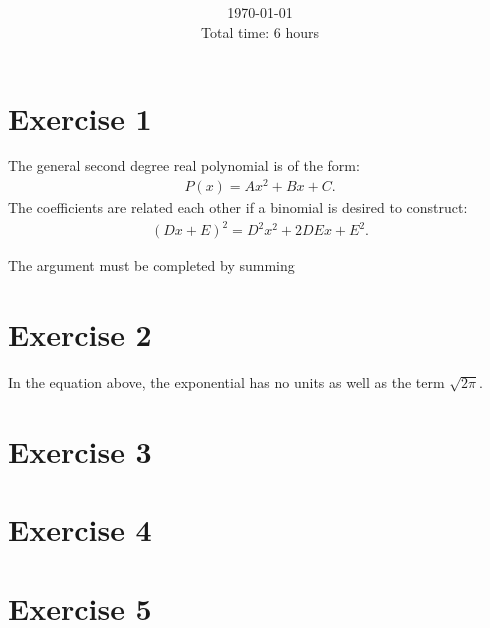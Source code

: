\documentclass[letterpaper,11pt,twoside]{article}
\title{\textbf{\assignment}\\\course\\{\Large\institution}}
\author{\autor}
\date{\today\\Total time: 6 hours}
\begin{document}
\pagestyle{mainstyle}
\maketitle
\section{Exercise 1}%
The general second degree real polynomial is of the form:
\begin{align}
  P(x)=Ax^2+Bx+C.
\end{align}
The coefficients are related each other if a binomial is desired to construct:
\begin{align*}
  (Dx+E)^2=D^2x^2+2DEx+E^2.
\end{align*}

The argument must be completed by summing 


\section{Exercise 2}
In the equation above, the exponential has no units as well as the term $\sqrt{2\pi}$. 

\section{Exercise 3}


\section{Exercise 4}

\section{Exercise 5}
\end{document}
